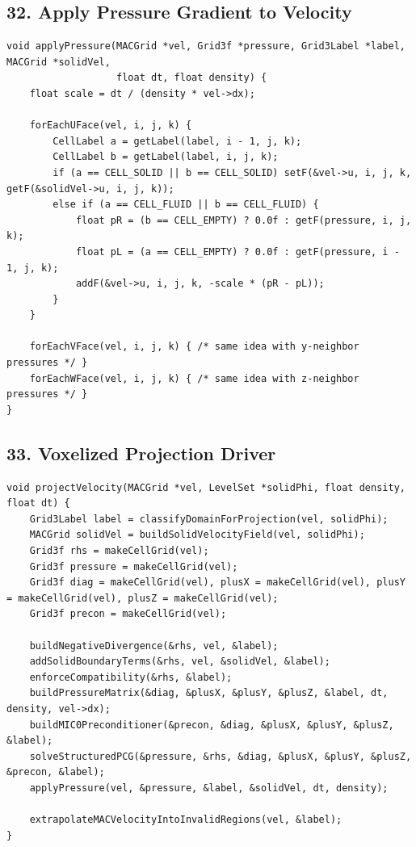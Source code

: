 \documentclass[10pt,letterpaper]{article}
\begin{document}
\subsection*{32. Apply Pressure Gradient to Velocity}

\begin{verbatim}
void applyPressure(MACGrid *vel, Grid3f *pressure, Grid3Label *label, MACGrid *solidVel,
                   float dt, float density) {
    float scale = dt / (density * vel->dx);

    forEachUFace(vel, i, j, k) {
        CellLabel a = getLabel(label, i - 1, j, k);
        CellLabel b = getLabel(label, i, j, k);
        if (a == CELL_SOLID || b == CELL_SOLID) setF(&vel->u, i, j, k, getF(&solidVel->u, i, j, k));
        else if (a == CELL_FLUID || b == CELL_FLUID) {
            float pR = (b == CELL_EMPTY) ? 0.0f : getF(pressure, i, j, k);
            float pL = (a == CELL_EMPTY) ? 0.0f : getF(pressure, i - 1, j, k);
            addF(&vel->u, i, j, k, -scale * (pR - pL));
        }
    }

    forEachVFace(vel, i, j, k) { /* same idea with y-neighbor pressures */ }
    forEachWFace(vel, i, j, k) { /* same idea with z-neighbor pressures */ }
}
\end{verbatim}

\subsection*{33. Voxelized Projection Driver}

\begin{verbatim}
void projectVelocity(MACGrid *vel, LevelSet *solidPhi, float density, float dt) {
    Grid3Label label = classifyDomainForProjection(vel, solidPhi);
    MACGrid solidVel = buildSolidVelocityField(vel, solidPhi);
    Grid3f rhs = makeCellGrid(vel);
    Grid3f pressure = makeCellGrid(vel);
    Grid3f diag = makeCellGrid(vel), plusX = makeCellGrid(vel), plusY = makeCellGrid(vel), plusZ = makeCellGrid(vel);
    Grid3f precon = makeCellGrid(vel);

    buildNegativeDivergence(&rhs, vel, &label);
    addSolidBoundaryTerms(&rhs, vel, &solidVel, &label);
    enforceCompatibility(&rhs, &label);
    buildPressureMatrix(&diag, &plusX, &plusY, &plusZ, &label, dt, density, vel->dx);
    buildMIC0Preconditioner(&precon, &diag, &plusX, &plusY, &plusZ, &label);
    solveStructuredPCG(&pressure, &rhs, &diag, &plusX, &plusY, &plusZ, &precon, &label);
    applyPressure(vel, &pressure, &label, &solidVel, dt, density);

    extrapolateMACVelocityIntoInvalidRegions(vel, &label);
}
\end{verbatim}
\end{document}
